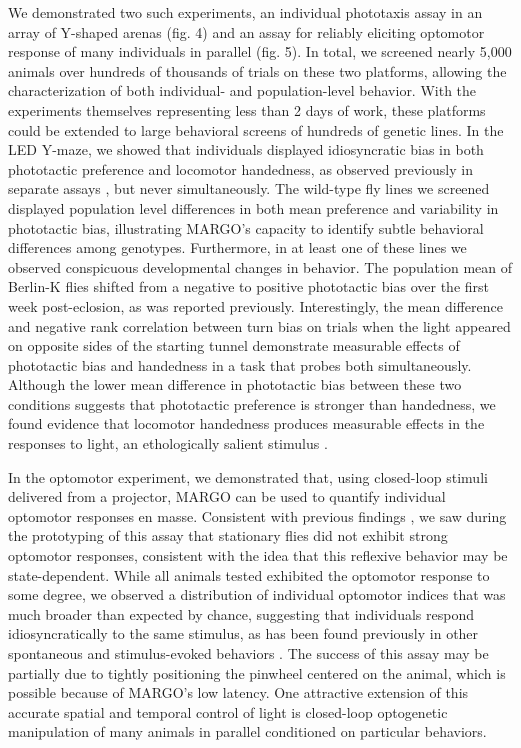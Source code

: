 \documentclass[10pt]{article}
\begin{document}
\begin{multicols}{2}
We demonstrated two such experiments, an individual phototaxis assay in an array of Y-shaped arenas (fig. 4) and an assay for reliably eliciting optomotor response of many individuals in parallel (fig. 5). In total, we screened nearly 5,000 animals over hundreds of thousands of trials on these two platforms, allowing the characterization of both individual- and population-level behavior. With the experiments themselves representing less than 2 days of work, these platforms could be extended to large behavioral screens of hundreds of genetic lines. In the LED Y-maze, we showed that individuals displayed idiosyncratic bias in both phototactic preference and locomotor handedness, as observed previously in separate assays \cite{Kain_Phototactic_2012,Buchanan_Neuronal_2015}, but never simultaneously. The wild-type fly lines we screened displayed population level differences in both mean preference and variability in phototactic bias, illustrating MARGO's capacity to identify subtle behavioral differences among genotypes. Furthermore, in at least one of these lines we observed conspicuous developmental changes in behavior. The population mean of Berlin-K flies shifted from a negative to positive phototactic bias over the first week post-eclosion, as was reported previously\cite{Chiang_Tactic_1963}. Interestingly, the mean difference and negative rank correlation between turn bias on trials when the light appeared on opposite sides of the starting tunnel demonstrate measurable effects of phototactic bias and handedness in a task that probes both simultaneously. Although the lower mean difference in phototactic bias between these two conditions suggests that phototactic preference is stronger than handedness, we found evidence that locomotor handedness produces measurable effects in the responses to light, an ethologically salient stimulus \cite{Kain_Variability_2015}. 

In the optomotor experiment, we demonstrated that, using closed-loop stimuli delivered from a projector, MARGO can be used to quantify individual optomotor responses en masse. Consistent with previous findings \cite{Zhu_Peripheral_2009,Kim_Fly_2016}, we saw during the prototyping of this assay that stationary flies did not exhibit strong optomotor responses, consistent with the idea that this reflexive behavior may be state-dependent\cite{Rosner_Behavioural_2009, Rien_Octopaminergic_2013, Chiappe_Walking_2010, Maimon_Active_2010,gorostiza_2018}. While all animals tested exhibited the optomotor response to some degree, we observed a distribution of individual optomotor indices that was much broader than expected by chance, suggesting that individuals respond idiosyncratically to the same stimulus, as has been found previously in other spontaneous and stimulus-evoked behaviors \cite{Kain_Phototactic_2012,Kain_Leg_2013,Kain_Variability_2015,Buchanan_Neuronal_2015,Todd_Systematic_2017}. The success of this assay may be partially due to tightly positioning the pinwheel centered on the animal, which is possible because of MARGO's low latency. One attractive extension of this accurate spatial and temporal control of light is closed-loop optogenetic manipulation of many animals in parallel conditioned on particular behaviors.


\end{multicols}
\end{document}
